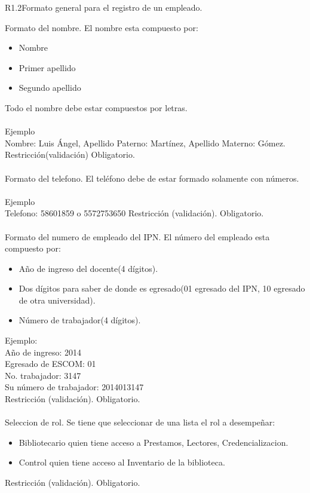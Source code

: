 \begin{BussinesRule}{R1.2}{Formato general para el registro de un empleado.} 

	\BRitem[Nombre:] Formato del nombre.
	\BRitem[Descripción:] El nombre esta compuesto por:
		\begin{itemize} 
			\item Nombre
			\item Primer apellido
			\item Segundo apellido 
		\end{itemize}
		Todo el nombre debe estar compuestos por letras.\\\\
	Ejemplo \\
	Nombre: Luis Ángel, Apellido Paterno: Martínez, Apellido Materno: Gómez.
	\BRitem[Tipo:] Restricción(validación)
	\BRitem[Nivel:] Obligatorio.\\\\

	\BRitem[Telefono:] Formato del telefono.
	\BRitem[Descripción:] El teléfono debe de estar formado solamente con números.\\\\
	Ejemplo \\
	Telefono: 58601859 o 5572753650
	\BRitem[Tipo:] Restricción (validación).
	\BRitem[Nivel:] Obligatorio.\\\\

	 Formato del numero de empleado del IPN.
	\BRitem[Descripción:] El número del empleado esta compuesto por:
		\begin{itemize} 
			\item Año de ingreso del docente(4 dígitos).
			\item Dos dígitos para saber de donde es egresado(01 egresado del IPN, 10 egresado de otra universidad).
			\item Número de trabajador(4 dígitos).
		\end{itemize}
	Ejemplo:\\
		Año de ingreso: 2014\\
		Egresado de ESCOM: 01\\
		No. trabajador: 3147\\
		Su número de trabajador: 2014013147\\
	\BRitem[Tipo:] Restricción (validación).
	\BRitem[Nivel:] Obligatorio.\\\\

	 Seleccion de rol.
	\BRitem[Descripción:] Se tiene que seleccionar de una lista el rol a desempeñar:
		\begin{itemize} 
			\item Bibliotecario quien tiene acceso a Prestamos, Lectores, Credencializacion.
			\item Control quien tiene acceso al Inventario de la biblioteca.
		\end{itemize}
	\BRitem[Tipo:] Restricción (validación).
	\BRitem[Nivel:] Obligatorio.\\\\


\end{BussinesRule}
